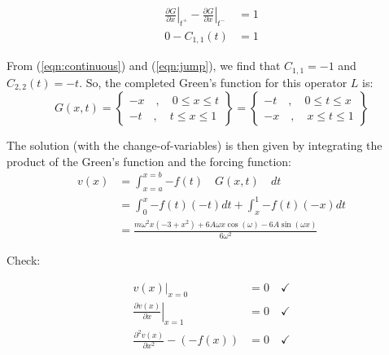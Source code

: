 \documentclass[10pt]{article}
\begin{document}
\begin{equation}
    \label{eqn:jump}
    \begin{split}
        \left. \frac{\partial G}{\partial x} \right| _{t^+} - \left. \frac{\partial G}{\partial x} \right| _{t^-} &= 1 \\
        0 - C_{1,1}(t) &= 1
    \end{split}
\end{equation}

From (\ref{eqn:continuous}) and (\ref{eqn:jump}), we find that $C_{1,1}=-1$ and $C_{2,2}(t)=-t$. So, the completed Green's function for this operator $L$ is:
\begin{equation}
    \label{eqn:green}
    G(x,t) = 
    \left\{ \begin{matrix}
        -x \quad , \quad 0 \le x \le t \\ 
        -t \quad , \quad t \le x \le 1
    \end{matrix} \right\}
    =
    \left\{ \begin{matrix}
        -t \quad , \quad 0 \le t \le x \\ 
        -x \quad , \quad x \le t \le 1
    \end{matrix} \right\} 
\end{equation}

The solution (with the change-of-variables) is then given by integrating the product of the Green's function and the forcing function:
\begin{equation}
    \label{eqn:v(x)}
    \begin{split}
        v(x) &= \int_{x=a}^{x=b}{-f(t) \quad G(x,t) \quad dt} \\
        &= \int_{0}^{x}{-f(t)(-t)dt} + \int_{x}^{1}{-f(t)(-x)dt} \\
        &= \frac{m \omega^2 x (-3 + x^2) + 6 A \omega x \cos(\omega) - 
        6 A \sin(\omega x)}{6 \omega^2}
    \end{split}
\end{equation}

Check:
    
\begin{equation}
    \begin{split}
        \left. v(x) \right|_{x=0} &= 0 \quad \checkmark \\
        \left. \frac{\partial v(x)}{\partial x} \right|_{x=1} &= 0 \quad \checkmark \\
        \frac{\partial^2 v(x)}{\partial x^2} - (-f(x)) &= 0 \quad \checkmark
    \end{split}
\end{equation}
\end{document}
